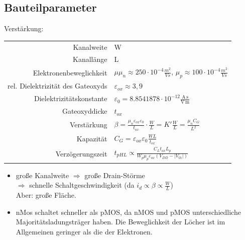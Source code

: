 \documentclass[6pt,a4paper]{scrartcl}
\newcommand{\Ra}[0]{\ensuremath{\Rightarrow}}									%
\begin{document}
\begin{multicols*}{3}
	\subsection{Bauteilparameter}
	Verstärkung:  \\
	\begin{tabular} {r | l}
		Kanalweite & W  \\
		Kanallänge & L  \\
		Elektronenbeweglichkeit & $\mu$\quad $\mu_n \approx 250 \cdot 10^{-4} \frac{m^2}{Vs}$, $\mu_p \approx 100 \cdot 10^{-4} \frac{m^2}{Vs}$ \\
		rel. Dielektrizität des Gateoxyds & $\varepsilon_{ox} \approx 3,9$ \\
		Dielektrizitätskonstante & $\varepsilon_0 = 8.8541878 \cdot 10^{-12} \frac{\mathrm{A\,s}}{\mathrm{V\,m}}$ \\
		Gateoxyddicke & $t_{ox}$ \\
		Verstärkung & $\beta = \frac{\mu_n \varepsilon_{ox} \varepsilon_0}{t_{ox}} \cdot \frac{W}{L} = K' \frac{W}{L} = \frac{\mu_n C_G}{L^2}$ \\
		Kapazität & $C_G = \varepsilon_{ox} \varepsilon_0 \frac{WL}{t_{ox}}$ \\
		Verzögerungszeit & $t_{pHL} \propto \frac{C_L t_{ox} L_p}{W_p \mu_p \varepsilon_{ox} (V_{DD} - |V_{th}|)}$ \\
	\end{tabular}
	\begin{itemize}
		\item große Kanalweite $\Ra$ große Drain-Störme \\ $\Ra$ schnelle Schaltgeschwindigkeit (da $i_d \propto \beta \propto \frac{W}{L}$) \\
		Aber: große Fläche.
		\item nMos schaltet schneller als pMOS, da nMOS und pMOS unterschiedliche Majoritätsladungsträger haben. Die Beweglichkeit der Löcher ist im Allgemeinen geringer als die der Elektronen. 
	\end{itemize}
	

\end{multicols*}
\end{document}
